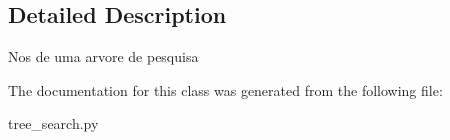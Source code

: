 \subsection{Detailed Description}
\begin{DoxyVerb}Nos de uma arvore de pesquisa\end{DoxyVerb}
 

The documentation for this class was generated from the following file\+:\begin{DoxyCompactItemize}
\item 
tree\+\_\+search.\+py\end{DoxyCompactItemize}
